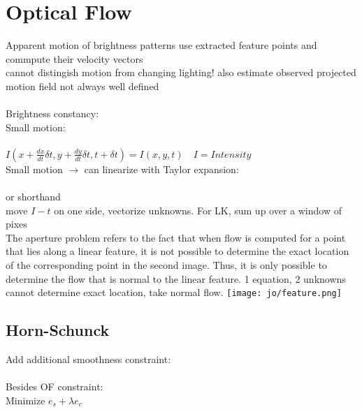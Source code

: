 \section{Optical Flow}
Apparent motion of brightness patterns use extracted feature points and commpute their velocity vectors \\
 cannot distingish motion from changing lighting! also estimate observed projected motion field  not always well defined \\
 \\
Brightness constancy: \\
Small motion: \\
\\
$I(x + \frac{dx}{dt}\delta t, y + \frac{dy}{dt} \delta t, t + \delta t) = I(x, y, t)
 \quad I = Intensity$\\
Small motion $\rightarrow$ can linearize with Taylor expansion:\\
 \\
 or shorthand \\
move $I-t$ on one side, vectorize unknowns. For LK, sum up over a window of pixes\\
 The aperture problem refers to the fact that when flow is computed for a point that lies along a linear feature, it is not possible to determine the exact location of the corresponding point in the second image. Thus, it is only possible to determine the flow that is normal to the linear feature. 1 equation, 2 unknowns cannot determine exact location, take normal flow. \texttt{[image: jo/feature.png]}\\
\subsection*{Horn-Schunck}
Add additional smoothness constraint: \\
\\
Besides OF constraint: \\
 Minimize $e_s + \lambda e_c$
